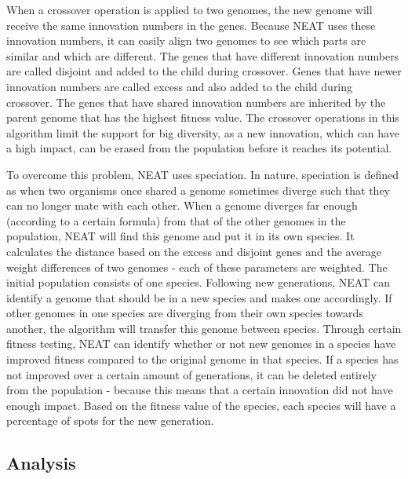 When a crossover operation is applied to two genomes, the new genome will receive the same innovation numbers in the genes.
Because NEAT uses these innovation numbers, it can easily align two genomes to see which parts are similar and which are different.
The genes that have different innovation numbers are called disjoint and added to the child during crossover.
Genes that have newer innovation numbers are called excess and also added to the child during crossover.
The genes that have shared innovation numbers are inherited by the parent genome that has the highest fitness value.
The crossover operations in this algorithm limit the support for big diversity, as a new innovation, which can have a high impact, can be erased from the population before it reaches its potential.

To overcome this problem, NEAT uses speciation.
In nature, speciation is defined as when two organisms once shared a genome sometimes diverge such that they can no longer mate with each other.
When a genome diverges far enough (according to a certain formula) from that of the other genomes in the population, NEAT will find this genome and put it in its own species.
It calculates the distance based on the excess and disjoint genes and the average weight differences of two genomes - each of these parameters are weighted.
The initial population consists of one species.
Following new generations, NEAT can identify a genome that should be in a new species and makes one accordingly.
If other genomes in one species are diverging from their own species towards another, the algorithm will transfer this genome between species.
Through certain fitness testing, NEAT can identify whether or not new genomes in a species have improved fitness compared to the original genome in that species.
If a species has not improved over a certain amount of generations, it can be deleted entirely from the population - because this means that a certain innovation did not have enough impact.
Based on the fitness value of the species, each species will have a percentage of spots for the new generation.

\subsection{Analysis}